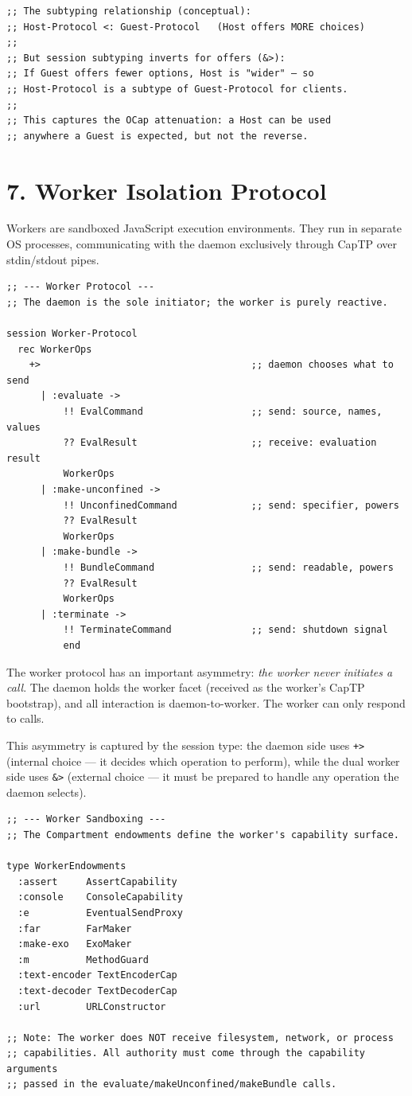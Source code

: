 \documentclass[11pt]{article}
\begin{document}
\begin{verbatim}
;; The subtyping relationship (conceptual):
;; Host-Protocol <: Guest-Protocol   (Host offers MORE choices)
;;
;; But session subtyping inverts for offers (&>):
;; If Guest offers fewer options, Host is "wider" — so
;; Host-Protocol is a subtype of Guest-Protocol for clients.
;;
;; This captures the OCap attenuation: a Host can be used
;; anywhere a Guest is expected, but not the reverse.
\end{verbatim}
\section{7. Worker Isolation Protocol}
\label{sec:orga438487}

Workers are sandboxed JavaScript execution environments. They run in
separate OS processes, communicating with the daemon exclusively through
CapTP over stdin/stdout pipes.

\begin{verbatim}
;; --- Worker Protocol ---
;; The daemon is the sole initiator; the worker is purely reactive.

session Worker-Protocol
  rec WorkerOps
    +>                                     ;; daemon chooses what to send
      | :evaluate ->
          !! EvalCommand                   ;; send: source, names, values
          ?? EvalResult                    ;; receive: evaluation result
          WorkerOps
      | :make-unconfined ->
          !! UnconfinedCommand             ;; send: specifier, powers
          ?? EvalResult
          WorkerOps
      | :make-bundle ->
          !! BundleCommand                 ;; send: readable, powers
          ?? EvalResult
          WorkerOps
      | :terminate ->
          !! TerminateCommand              ;; send: shutdown signal
          end
\end{verbatim}

The worker protocol has an important asymmetry: \emph{the worker never initiates
a call}. The daemon holds the worker facet (received as the worker's CapTP
bootstrap), and all interaction is daemon-to-worker. The worker can only
respond to calls.

This asymmetry is captured by the session type: the daemon side uses \texttt{+>}
(internal choice --- it decides which operation to perform), while the dual
worker side uses \texttt{\&>} (external choice --- it must be prepared to handle
any operation the daemon selects).

\begin{verbatim}
;; --- Worker Sandboxing ---
;; The Compartment endowments define the worker's capability surface.

type WorkerEndowments
  :assert     AssertCapability
  :console    ConsoleCapability
  :e          EventualSendProxy
  :far        FarMaker
  :make-exo   ExoMaker
  :m          MethodGuard
  :text-encoder TextEncoderCap
  :text-decoder TextDecoderCap
  :url        URLConstructor

;; Note: The worker does NOT receive filesystem, network, or process
;; capabilities. All authority must come through the capability arguments
;; passed in the evaluate/makeUnconfined/makeBundle calls.
\end{verbatim}
\end{document}

